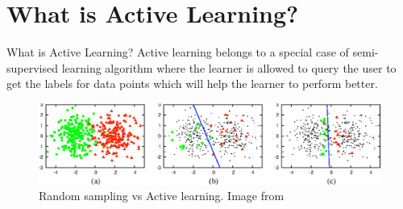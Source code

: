 \documentclass{beamer}
\begin{document}
\section{What is Active Learning?}
\begin{frame}{What is Active Learning?}
Active learning belongs to a special case of semi-supervised learning algorithm	where the learner is allowed to query the user to get the labels for data points which will help the learner to perform better. \cite{Settles2010} 
		\begin{figure}[!htb]
			\centering
			\includegraphics[scale=0.30]{images/what_ai}
			\caption{Random sampling vs Active learning. Image from \cite{Settles2010}}
			\label{auto_workflow}
		\end{figure}
	
%				
%				
\end{frame}





\end{document}
